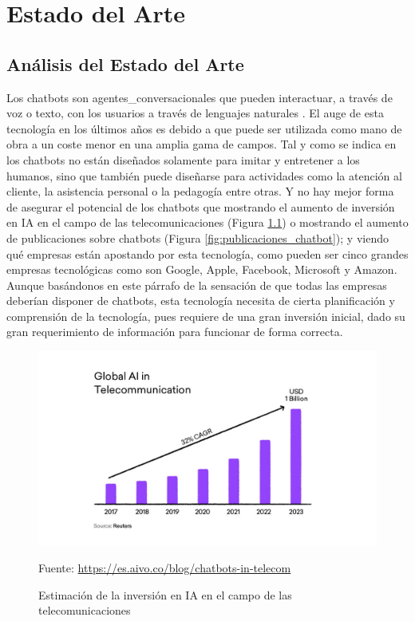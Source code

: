 \chapter{Estado del Arte}

\section{Análisis del Estado del Arte} \label{sec:analisis_estado_arte}

Los chatbots son \gls{agentes_conversacionales} que pueden interactuar, a través de voz o texto, con los usuarios a través de lenguajes naturales \cite{RefWorks:RefID:36-luo2022critical}. El auge de esta tecnología en los últimos años es debido a que puede ser utilizada como mano de obra a un coste menor en una amplia gama de campos. Tal y como se indica en \cite{RefWorks:RefID:37-adamopoulou2020overview} los chatbots no están diseñados solamente para imitar y entretener a los humanos, sino que también puede diseñarse para actividades como la atención al cliente, la asistencia personal o la pedagogía entre otras. Y no hay mejor forma de asegurar el potencial de los chatbots que mostrando el aumento de inversión en \gls{IA} en el campo de las telecomunicaciones (Figura \ref{fig:inversion_chatbot}) o mostrando el aumento de publicaciones sobre chatbots (Figura \ref{fig:publicaciones_chatbot}); y viendo qué empresas están apostando por esta tecnología, como pueden ser cinco grandes empresas tecnológicas como son Google, Apple, Facebook, Microsoft y Amazon. Aunque basándonos en este párrafo de la sensación de que todas las empresas deberían disponer de chatbots, esta tecnología necesita de cierta planificación y comprensión de la tecnología, pues requiere de una gran inversión inicial, dado su gran requerimiento de información para funcionar de forma correcta.

\begin{figure}[h]
\centering
\includegraphics[width=1.0\textwidth]{imagenes/02_EstadoDelArte/inversion_chatbots.jpg}
\begin{center}
Fuente: \url{https://es.aivo.co/blog/chatbots-in-telecom}
\end{center}
\caption{Estimación de la inversión en IA en el campo de las telecomunicaciones}
\label{fig:inversion_chatbot}
\end{figure}

